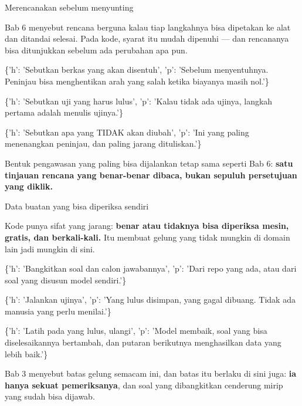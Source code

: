 \documentclass[aspectratio=169,11pt,t]{beamer}
\begin{document}
\begin{frame}[shrink=25]{Merencanakan sebelum menyunting}
{\fontsize{9.4}{12.6}\selectfont\color{fg2}Bab 6 menyebut rencana berguna kalau tiap langkahnya bisa dipetakan ke alat dan ditandai selesai. Pada kode, syarat itu mudah dipenuhi --- dan rencananya bisa ditunjukkan sebelum ada perubahan apa pun.\par}\vskip 4pt
\begin{isteps}
\item \{'h': 'Sebutkan berkas yang akan disentuh', 'p': 'Sebelum menyentuhnya. Peninjau bisa menghentikan arah yang salah ketika biayanya masih nol.'\}
\item \{'h': 'Sebutkan uji yang harus lulus', 'p': 'Kalau tidak ada ujinya, langkah pertama adalah menulis ujinya.'\}
\item \{'h': 'Sebutkan apa yang TIDAK akan diubah', 'p': 'Ini yang paling menenangkan peninjau, dan paling jarang dituliskan.'\}
\end{isteps}
\begin{iband}[signal]
Bentuk pengawasan yang paling bisa dijalankan tetap sama seperti Bab 6: \textbf{satu tinjauan rencana yang benar-benar dibaca, bukan sepuluh persetujuan yang diklik.}
\end{iband}
\end{frame}


\begin{frame}[shrink=25]{Data buatan yang bisa diperiksa sendiri}
{\fontsize{9.4}{12.6}\selectfont\color{fg2}Kode punya sifat yang jarang: \textbf{benar atau tidaknya bisa diperiksa mesin, gratis, dan berkali-kali.} Itu membuat gelung yang tidak mungkin di domain lain jadi mungkin di sini.\par}\vskip 4pt
\begin{isteps}
\item \{'h': 'Bangkitkan soal dan calon jawabannya', 'p': 'Dari repo yang ada, atau dari soal yang disusun model sendiri.'\}
\item \{'h': 'Jalankan ujinya', 'p': 'Yang lulus disimpan, yang gagal dibuang. Tidak ada manusia yang perlu menilai.'\}
\item \{'h': 'Latih pada yang lulus, ulangi', 'p': 'Model membaik, soal yang bisa diselesaikannya bertambah, dan putaran berikutnya menghasilkan data yang lebih baik.'\}
\end{isteps}
\begin{iband}[signal]
Bab 3 menyebut batas gelung semacam ini, dan batas itu berlaku di sini juga: \textbf{ia hanya sekuat pemeriksanya}, dan soal yang dibangkitkan cenderung mirip yang sudah bisa dijawab.
\end{iband}
\end{frame}
\end{document}
